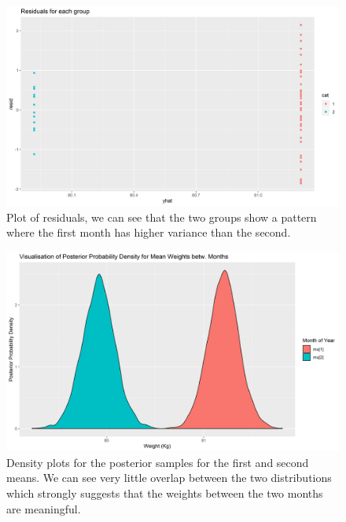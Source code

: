 \documentclass[journal, a4paper]{IEEEtran}
\begin{document}
\begin{figure}[h!]
	\includegraphics[width=\linewidth]{../plots/06_mod1_resid_2.png}
	\caption{Plot of residuals, we can see that the two groups show a pattern where the first month has higher variance than the second.}
	\label{fig:8}
\end{figure}

\begin{figure}[h!]
	\includegraphics[width=\linewidth]{../plots/07_post_dist_weights.png}
	\caption{Density plots for the posterior samples for the first and second means. We can see very little overlap between the two distributions which strongly
	suggests that the weights between the two months are meaningful.}
	\label{fig:9}
\end{figure}
\end{document}
